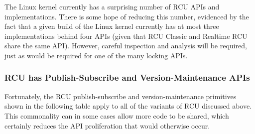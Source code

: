 The Linux kernel currently has a surprising number of RCU APIs and
implementations.
There is some hope of reducing this number, evidenced by the fact
that a given build of the Linux kernel currently has at most
three implementations behind four APIs (given that RCU Classic
and Realtime RCU share the same API).
However, careful inspection and analysis will be required, just as
would be required for one of the many locking APIs.

\subsubsection{RCU has Publish-Subscribe and Version-Maintenance APIs}
\label{sec:defer:RCU has Publish-Subscribe and Version-Maintenance APIs}

Fortunately, the RCU publish-subscribe and version-maintenance
primitives shown in the following
table apply to all of the variants of RCU discussed above.
This commonality can in some cases allow more code to be shared,
which certainly reduces the API proliferation that would otherwise
occur.

